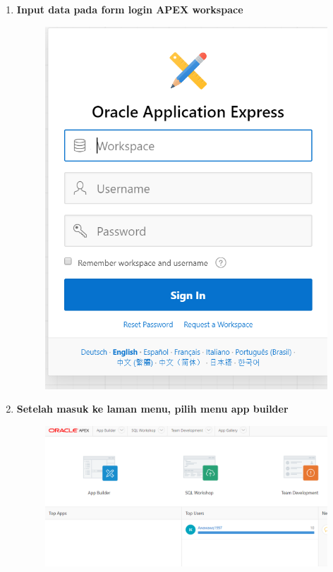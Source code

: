 \begin{enumerate}
\item \textbf{Input data pada form login APEX workspace}\begin{figure}[H]
    \centering
    \includegraphics[scale=0.3]{figures/8.png}
    \label{8}
\end{figure}


\item \textbf{Setelah masuk ke laman menu, pilih menu app builder}\begin{figure}[H]
    \centering
    \includegraphics[scale=0.3]{figures/9.png}
    \label{9}
\end{figure}



\end{enumerate}

